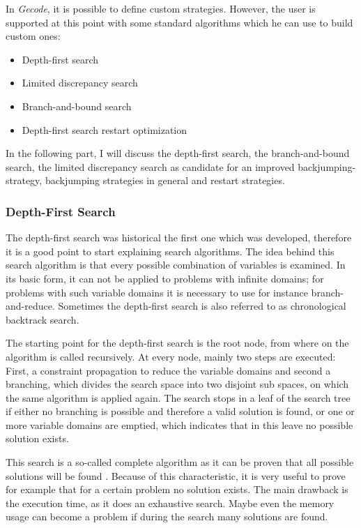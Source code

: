 \documentclass[10pt,
               a4paper,
               journal,
               ]{IEEEtran}
\begin{document}
	In \emph{Gecode}, it is possible to define custom strategies. However, the user is supported at this point with some standard algorithms which he can use to build custom ones:
	\begin{itemize}
		\item Depth-first search
		\item Limited discrepancy search
		\item Branch-and-bound search
		\item Depth-first search restart optimization
	\end{itemize}
	
	In the following part, I will discuss the depth-first search, the branch-and-bound search, the limited discrepancy search as candidate for an improved backjumping-strategy, backjumping strategies in general and restart strategies.
	
	\subsubsection{Depth-First Search}
	The depth-first search was historical the first one which was developed, therefore it is a good point to start explaining search algorithms. The idea behind this search algorithm is that every possible combination of variables is examined. In its basic form, it can not be applied to problems with infinite domains; for problems with such variable domains it is necessary to use for instance branch-and-reduce. Sometimes the depth-first search is also referred to as chronological backtrack search.
	
	The starting point for the depth-first search is the root node, from where on the algorithm is called recursively. At every node, mainly two steps are executed: First, a constraint propagation to reduce the variable domains and second a branching, which divides the search space into two disjoint sub spaces, on which the same algorithm is applied again. The search stops in a leaf of the search tree if either no branching is possible and therefore a valid solution is found, or one or more variable domains are emptied, which indicates that in this leave no possible solution exists.
	
	This search is a so-called complete algorithm as it can be proven that all possible solutions will be found \cite[p.~85]{handbookCP}. Because of this characteristic, it is very useful to prove for example that for a certain problem no solution exists. The main drawback is the execution time, as it does an exhaustive search. Maybe even the memory usage can become a problem if during the search many solutions are found.
	
\end{document}
